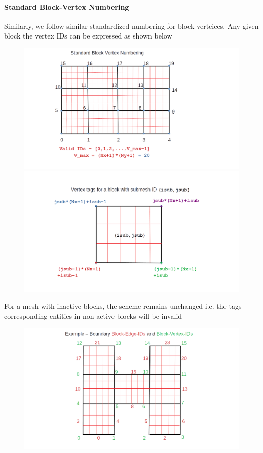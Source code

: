 \documentclass[a4paper,12pt]{article}
\begin{document}
\paragraph{Standard Block-Vertex Numbering}
Similarly, we follow similar standardized numbering for block vertcices. Any given block the vertex IDs can be expressed as shown below
\begin{figure}[H]
	\centering
	\includegraphics[trim=140 40 200 38,clip,scale=0.3]{figures/Block-Vert-Numbered.png}
	\includegraphics[trim=140 0 100 0,clip,scale=0.3]{figures/Std-Block-Vert-IDs.png}
\end{figure}

For a mesh with inactive blocks, the scheme remains unchanged i.e. the tags corresponding entities in non-active blocks will be invalid
\begin{figure}[H]
	\centering
	\includegraphics[trim=140 0 200 0,clip,scale=0.3]{figures/Block-EV-ID-Eg.png}
\end{figure}
\end{document}
